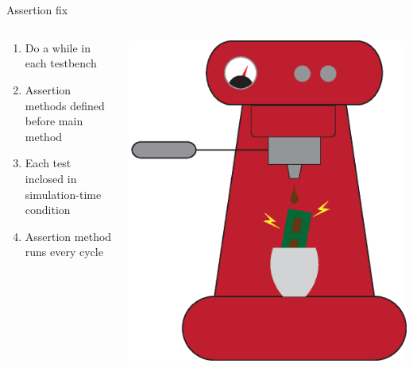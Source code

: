 \documentclass[aspectratio=169, handout]{beamer}
\begin{document}
\section*{}
\begin{frame}{Assertion fix}
    \begin{columns}[c]
        \begin{column}{.3\textwidth}
            \begin{enumerate}
                \item Do a while in each testbench
                \item Assertion methods defined before main method
                \item Each test inclosed in simulation-time condition
                \item Assertion method runs every cycle
            \end{enumerate}
        \end{column}
        \begin{column}{.5\textwidth}
            \includegraphics[width=.8\columnwidth]{graphics/steelbrew.eps}
        \end{column}
    \end{columns}
\end{frame}
\end{document}
